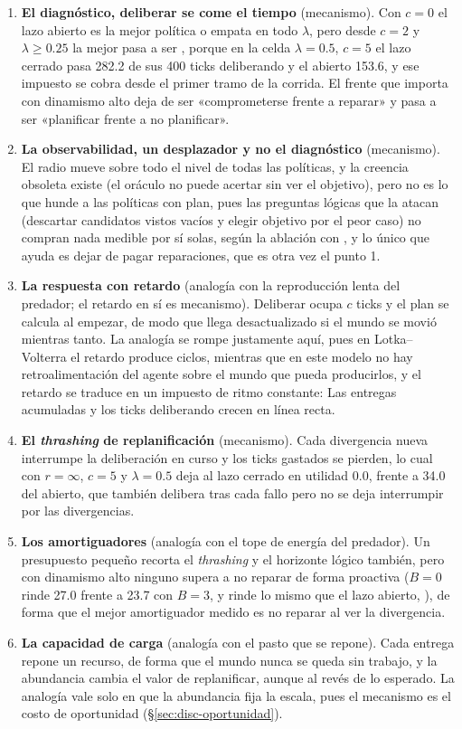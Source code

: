 \begin{enumerate}[leftmargin=1.6em, itemsep=0.3em]
  \item \textbf{El diagnóstico, deliberar se come el tiempo} (mecanismo). Con $c=0$ el lazo abierto es la mejor política o empata en todo $\lambda$, pero desde $c=2$ y $\lambda\ge0.25$ la mejor pasa a ser \MB, porque en la celda $\lambda=0.5$, $c=5$ el lazo cerrado pasa 282.2 de sus 400 ticks deliberando y el abierto 153.6, y ese impuesto se cobra desde el primer tramo de la corrida. El frente que importa con dinamismo alto deja de ser «comprometerse frente a reparar» y pasa a ser «planificar frente a no planificar».
  \item \textbf{La observabilidad, un desplazador y no el diagnóstico} (mecanismo). El radio mueve sobre todo el nivel de todas las políticas, y la creencia obsoleta existe (el oráculo no puede acertar sin ver el objetivo), pero no es lo que hunde a las políticas con plan, pues las preguntas lógicas que la atacan (descartar candidatos vistos vacíos y elegir objetivo por el peor caso) no compran nada medible por sí solas, según la ablación con \ahora, y lo único que ayuda es dejar de pagar reparaciones, que es otra vez el punto 1.
  \item \textbf{La respuesta con retardo} (analogía con la reproducción lenta del predador; el retardo en sí es mecanismo). Deliberar ocupa $c$ ticks y el plan se calcula al empezar, de modo que llega desactualizado si el mundo se movió mientras tanto. La analogía se rompe justamente aquí, pues en Lotka–Volterra el retardo produce ciclos, mientras que en este modelo no hay retroalimentación del agente sobre el mundo que pueda producirlos, y el retardo se traduce en un impuesto de ritmo constante: Las entregas acumuladas y los ticks deliberando crecen en línea recta.
  \item \textbf{El \emph{thrashing} de replanificación} (mecanismo). Cada divergencia nueva interrumpe la deliberación en curso y los ticks gastados se pierden, lo cual con $r=\infty$, $c=5$ y $\lambda=0.5$ deja al lazo cerrado en utilidad 0.0, frente a 34.0 del abierto, que también delibera tras cada fallo pero no se deja interrumpir por las divergencias.
  \item \textbf{Los amortiguadores} (analogía con el tope de energía del predador). Un presupuesto pequeño recorta el \emph{thrashing} y el horizonte lógico también, pero con dinamismo alto ninguno supera a no reparar de forma proactiva ($B=0$ rinde 27.0 frente a 23.7 con $B=3$, y \KB{} rinde lo mismo que el lazo abierto, ), de forma que el mejor amortiguador medido es no reparar al ver la divergencia.
  \item \textbf{La capacidad de carga} (analogía con el pasto que se repone). Cada entrega repone un recurso, de forma que el mundo nunca se queda sin trabajo, y la abundancia cambia el valor de replanificar, aunque al revés de lo esperado. La analogía vale solo en que la abundancia fija la escala, pues el mecanismo es el costo de oportunidad (§\ref{sec:disc-oportunidad}).
\end{enumerate}

